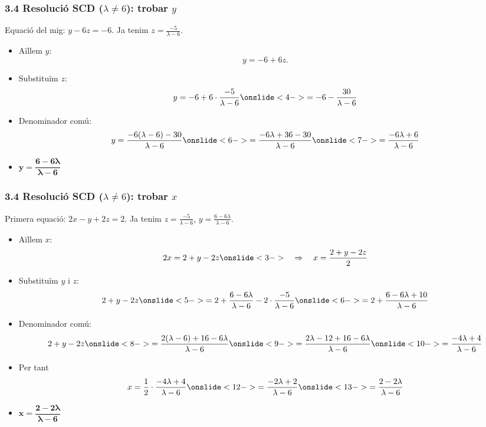 \documentclass[aspectratio=169]{beamer}
\newcommand{\solucio}[1]{{\color{margueVerdFosc}\ensuremath{\mathbf{#1}}}}
\begin{document}
\begin{frame}[t]
  \frametitle{3.4 Resolució SCD ($\lambda\neq 6$): trobar $y$}

  \vspace{-0.28cm}
  Equació del mig: \;$y - 6z = -6$.
  Ja tenim \;$\displaystyle z=\frac{-5}{\lambda-6}$.

  \vspace{0.08cm}
  \begin{itemize}
    \item<2-> Aïllem $y$:
      \[
        y = -6 + 6z.
      \]
    \item<3-> Substituïm $z$:
      \[
        y = -6 + 6\cdot\frac{-5}{\lambda-6}
        \onslide<4->{= -6 - \frac{30}{\lambda-6}}
      \]
    \item<5-> Denominador comú:
      \[
        y = \frac{-6(\lambda-6) - 30}{\lambda-6}
        \onslide<6->{= \frac{-6\lambda + 36 - 30}{\lambda-6}}
        \onslide<7->{= \frac{-6\lambda + 6}{\lambda-6}}
      \]
    \item<8-> \solucio{y = \dfrac{6-6\lambda}{\lambda-6}}
  \end{itemize}
\end{frame}

\begin{frame}[t]
  \frametitle{3.4 Resolució SCD ($\lambda\neq 6$): trobar $x$}

  \vspace{-0.32cm}
  Primera equació: \;$2x - y + 2z = 2$.
  {\small Ja tenim
  $\displaystyle z=\frac{-5}{\lambda-6}$,\;
  $\displaystyle y=\frac{6-6\lambda}{\lambda-6}$.}

  \vspace{0.06cm}
  \begin{itemize}
    \item<2-> Aïllem $x$:
      \[
        2x = 2 + y - 2z
        \onslide<3->{\quad\Rightarrow\quad x = \frac{2 + y - 2z}{2}}
      \]
    \item<4-> Substituïm $y$ i $z$:
      \[
        2 + y - 2z
        \onslide<5->{= 2 + \frac{6-6\lambda}{\lambda-6} - 2\cdot\frac{-5}{\lambda-6}}
        \onslide<6->{= 2 + \frac{6-6\lambda + 10}{\lambda-6}}
      \]
    \item<7-> Denominador comú:
      \[
        2 + y - 2z
        \onslide<8->{= \frac{2(\lambda-6) + 16 - 6\lambda}{\lambda-6}}
        \onslide<9->{= \frac{2\lambda - 12 + 16 - 6\lambda}{\lambda-6}}
        \onslide<10->{= \frac{-4\lambda + 4}{\lambda-6}}
      \]
    \item<11-> Per tant
      \[
        x = \frac{1}{2}\cdot\frac{-4\lambda + 4}{\lambda-6}
        \onslide<12->{= \frac{-2\lambda + 2}{\lambda-6}}
        \onslide<13->{= \frac{2-2\lambda}{\lambda-6}}
      \]
    \item<14-> \solucio{x = \dfrac{2-2\lambda}{\lambda-6}}
  \end{itemize}
\end{frame}
\end{document}
